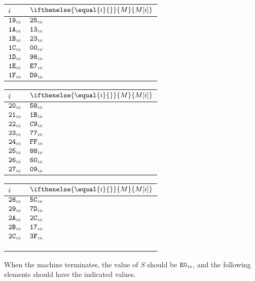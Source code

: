 \documentclass[a4paper,12pt]{article}
\makeatletter
\newcommand{\num}[1]{\texttt{#1}}
\newcommand{\hex}[1]{\num{#1}_{\textup{\tiny 16}}}
\newcommand{\MEM}[1]{\ifthenelse{\equal{#1}{}}{M}{M[#1]}}
\newcommand{\SP}{S}
\newenvironment{memtable}{%
  \begin{trivlist}
    \item
    }{%
    \end{trivlist}}
\newenvironment{memcolumn}{%
  \begin{tabular}{@{}ll@{}}
    $i$ & $\MEM{i}$ \\
    \hline}
    {%
    \hline
  \end{tabular}}
\newcommand{\memspace}{\qquad}
\makeatother
\begin{document}
\begin{memtable}
\begin{memcolumn}
    $\hex{19}$ & $\hex{25}$ \\
    $\hex{1A}$ & $\hex{13}$ \\
    $\hex{1B}$ & $\hex{23}$ \\
    $\hex{1C}$ & $\hex{00}$ \\
    $\hex{1D}$ & $\hex{98}$ \\
    $\hex{1E}$ & $\hex{E7}$ \\
    $\hex{1F}$ & $\hex{D9}$ \\
  \end{memcolumn}
  \memspace
  \begin{memcolumn}
    $\hex{20}$ & $\hex{58}$ \\
    $\hex{21}$ & $\hex{1B}$ \\
    $\hex{22}$ & $\hex{C9}$ \\
    $\hex{23}$ & $\hex{77}$ \\
    $\hex{24}$ & $\hex{FF}$ \\
    $\hex{25}$ & $\hex{88}$ \\
    $\hex{26}$ & $\hex{60}$ \\
    $\hex{27}$ & $\hex{09}$ \\
  \end{memcolumn}
  \memspace
  \begin{memcolumn}
    $\hex{28}$ & $\hex{5C}$ \\
    $\hex{29}$ & $\hex{7D}$ \\
    $\hex{2A}$ & $\hex{2C}$ \\
    $\hex{2B}$ & $\hex{17}$ \\
    $\hex{2C}$ & $\hex{3F}$ \\
    \\
    \\
    \\
  \end{memcolumn}
\end{memtable}
When the machine terminates, the value of $\SP$ should be $\hex{E0}$, and the following elements should have the indicated values.
\end{document}
